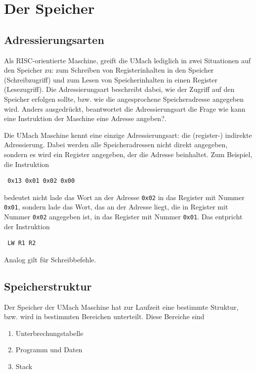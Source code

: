 \section{Der Speicher}
\label{sec:Speicher}

\subsection{Adressierungsarten}
\label{subsec:Adressierungsarten}

Als RISC-orientierte Maschine, greift die UMach lediglich in zwei Situationen
auf den Speicher zu: zum Schreiben von Registerinhalten in den Speicher
(Schreibzugriff) und zum Lesen von Speicherinhalten in einen Register
(Lesezugriff).  Die \gls{Adressierungsart} beschreibt dabei, wie der Zugriff
auf den Speicher erfolgen sollte, bzw. wie die angesprochene Speicheradresse
angegeben wird. Anders ausgedrückt, beantwortet die Adressierungsart die Frage
\glqq wie kann eine Instruktion der Maschine eine Adresse angeben?\grqq. 

Die UMach Maschine kennt eine einzige Adressierungsart: die (register-)
indirekte Adressierung. Dabei werden alle Speicheradressen nicht direkt
angegeben, sondern es wird ein Register angegeben, der die Adresse beinhaltet.
Zum Beispiel, die Instruktion 
\begin{lstlisting}
 0x13 0x01 0x02 0x00
\end{lstlisting}
bedeutet nicht \glqq lade das Wort an der Adresse \texttt{0x02} in das Register
mit Nummer \texttt{0x01}\grqq, sondern \glqq lade das Wort, das an der Adresse
liegt, die in Register mit Nummer \texttt{0x02} angegeben ist, in das Register
mit Nummer \texttt{0x01}\grqq. Das entpricht der Instruktion
\begin{lstlisting}
 LW R1 R2
\end{lstlisting}
Analog gilt für Schreibbefehle.


\subsection{Speicherstruktur}

Der Speicher der UMach Maschine hat zur Laufzeit eine bestimmte Struktur, bzw.
wird in bestimmten Bereichen unterteilt. Diese Bereiche sind
\begin{enumerate}
 \item Unterbrechungstabelle
 \item Programm und Daten
 \item Stack
\end{enumerate}

